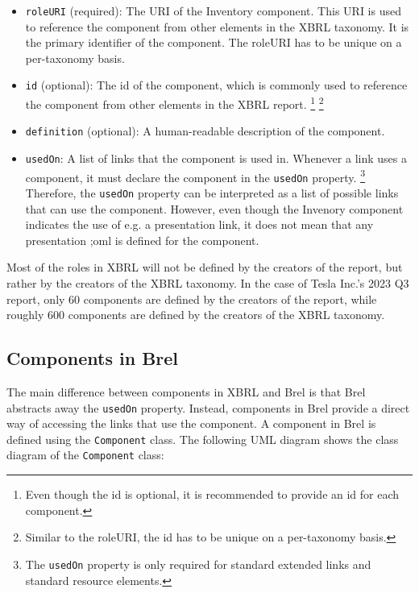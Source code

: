 \begin{itemize}
  \item \texttt{roleURI} (required): The URI of the Inventory component. This URI is used to reference the component from other elements in the XBRL taxonomy. It is the primary identifier of the component. 
  The roleURI has to be unique on a per-taxonomy basis.\cite{xbrl21_custom_roles}
  \item \texttt{id} (optional): The id of the component, which is commonly used to reference the component from other elements in the XBRL report.
  \footnote{Even though the id is optional, it is recommended to provide an id for each component.\cite{xbrl21_custom_roles}}
  \footnote{Similar to the roleURI, the id has to be unique on a per-taxonomy basis.\cite{xml_id}}
  \item \texttt{definition} (optional): A human-readable description of the component. 
  \item \texttt{usedOn}: A list of links that the component is used in. 
  Whenever a link uses a component, it must declare the component in the \texttt{usedOn} property.
  \footnote{The \texttt{usedOn} property is only required for standard extended links and standard resource elements.\cite{xbrl21_custom_roles}}
  Therefore, the \texttt{usedOn} property can be interpreted as a list of possible links that can use the component.
  However, even though the Invenory component indicates the use of e.g. a presentation link, it does not mean that any presentation ;oml is defined for the component.
\end{itemize}

Most of the roles in XBRL will not be defined by the creators of the report, but rather by the creators of the XBRL taxonomy. 
In the case of Tesla Inc.'s 2023 Q3 report, only 60 components are defined by the creators of the report, while roughly 600 components are defined by the creators of the XBRL taxonomy.\cite{tesla_10q_2023_q3}

\subsection{Components in Brel}

The main difference between components in XBRL and Brel is that Brel abstracts away the \texttt{usedOn} property. 
Instead, components in Brel provide a direct way of accessing the links that use the component. 
A component in Brel is defined using the \texttt{Component} class. 
The following UML diagram shows the class diagram of the \texttt{Component} class:

